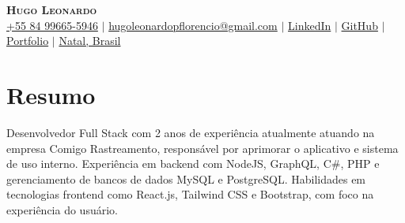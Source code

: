 \documentclass[letterpaper,11pt]{article}
\newcommand{\resumeSubHeadingListStart}{\begin{itemize}[leftmargin=0.15in, label={}]}
\newcommand{\resumeSubHeadingListEnd}{\end{itemize}}
\begin{document}

\begin{center}
    \textbf{\Huge \scshape Hugo Leonardo} \\ \vspace{3pt}
    \small
    \faMobile \hspace{.5pt} \href{tel:5584996655946}{+55 84 99665-5946}
    $|$
    \faAt \hspace{.5pt} \href{mailto:hugoleonardopflorencio@gmail.com}{hugoleonardopflorencio@gmail.com}
    $|$
    \faLinkedinSquare \hspace{.5pt} \href{https://www.linkedin.com/in/hugo-leonardo-dev/}{LinkedIn}
    $|$
    \faGithub \hspace{.5pt} \href{https://github.com/hugo-leonardo-dev}{GitHub}
    $|$
    \faGlobe \hspace{.5pt} \href{https://hugoleonardo-portfolio.vercel.app/}{Portfolio}
    $|$
    \faMapMarker \hspace{.5pt} \href{https://www.google.com/maps/place/Universidade+Potiguar/@-5.8142926,-35.208523,17z/data=!3m1!4b1!4m6!3m5!1s0x7b2fff078a448af:0x2940929cd12bc0b6!8m2!3d-5.8142979!4d-35.2059481!16s%2Fg%2F1pxw2_tms?entry=ttu&g_ep=EgoyMDI1MDQwOC4wIKXMDSoASAFQAw%3D%3D}{Natal, Brasil}
\end{center}




\section{Resumo}
  \vspace{3pt}
  \resumeSubHeadingListStart
    \small{\item{
        Desenvolvedor Full Stack com 2 anos de experiência atualmente atuando na empresa Comigo Rastreamento, responsável por aprimorar o aplicativo e sistema de uso interno. Experiência em backend com NodeJS, GraphQL,  C\#, PHP e gerenciamento de bancos de dados MySQL e PostgreSQL. Habilidades em tecnologias frontend como React.js, Tailwind CSS e Bootstrap, com foco na experiência do usuário.
    }}
  \resumeSubHeadingListEnd


\end{document}
